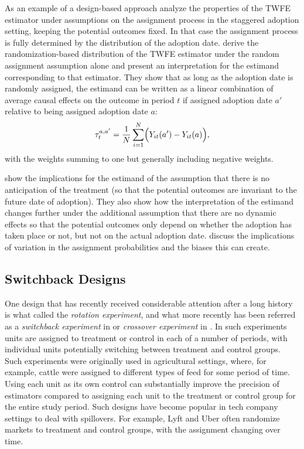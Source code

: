 \documentclass[letterpaper,12pt,leqno]{article}
\begin{document}
As an example of a design-based approach
\citep{athey2021design} analyze the properties of the TWFE estimator under assumptions on the assignment process in the staggered adoption setting, keeping the potential outcomes fixed. In that case the assignment process is fully determined by the distribution of the adoption date. 
\citep{athey2021design} derive the randomization-based distribution of the TWFE estimator under the random assignment assumption alone and present an interpretation for the estimand corresponding to that estimator.
They show that as long as the adoption date is randomly assigned, the estimand can be written as a linear combination 
of average causal effects on the outcome in period $t$ if assigned adoption date $a'$ relative to being assigned adoption date $a$:
\begin{equation}\label{eq:athey_imbens_2}
\tau^{a,a'}_t=\frac{1}{N}\sum_{i=1}^N\Bigl( Y_{it}(a')- Y_{it}(a)\Bigr),
    \end{equation}
with the weights summing to one but generally including negative weights.

\citep{athey2021design}  show the implications for the estimand of
the assumption that there is no anticipation of the treatment (so that the potential outcomes are invariant to the future date of adoption). 
They also show how the interpretation of the estimand changes further under the additional assumption that there are no dynamic effects so that the potential outcomes only depend on whether the adoption has taken place or not, but not on the actual adoption date. \citep{rambachan2020design} discuss the implications of variation in the assignment probabilities and the biases this can create.

\subsection{Switchback Designs}

One design that has recently received considerable attention after a long history is what 
\citep{cochran1939long} called the {\it rotation experiment}, and what more recently has been referred as a {\it switchback experiment} in \citep{bojinov2022design}
or {\it crossover experiment} in 
\citep{brown1980crossover}.
In such experiments units are assigned to treatment or control in each of a number of periods, with individual units potentially switching between treatment and control groups. Such experiments were originally used in agricultural settings, where, for example, cattle were assigned to different types of feed for some period of time. Using each unit as its own control can substantially improve the precision of estimators compared to assigning each unit to the treatment or control group for the entire study period. Such designs have become popular in tech company settings to deal with spillovers. For example, Lyft and Uber often randomize markets to treatment and control groups, with the assignment changing over time.
\end{document}
